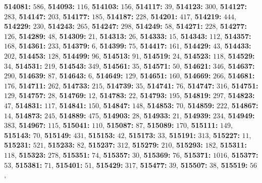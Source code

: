 \textsf{\bfseries 514081:} $586$, \textsf{\bfseries 514093:} $116$, \textsf{\bfseries 514103:} $156$, \textsf{\bfseries 514117:} $39$, \textsf{\bfseries 514123:} $300$, \textsf{\bfseries 514127:} $283$, \textsf{\bfseries 514147:} $203$, \textsf{\bfseries 514177:} $185$, \textsf{\bfseries 514187:} $228$, \textsf{\bfseries 514201:} $417$, \textsf{\bfseries 514219:} $444$, \textsf{\bfseries 514229:} $230$, \textsf{\bfseries 514243:} $265$, \textsf{\bfseries 514247:} $298$, \textsf{\bfseries 514249:} $58$, \textsf{\bfseries 514271:} $228$, \textsf{\bfseries 514277:} $126$, \textsf{\bfseries 514289:} $48$, \textsf{\bfseries 514309:} $21$, \textsf{\bfseries 514313:} $26$, \textsf{\bfseries 514333:} $15$, \textsf{\bfseries 514343:} $112$, \textsf{\bfseries 514357:} $168$, \textsf{\bfseries 514361:} $233$, \textsf{\bfseries 514379:} $6$, \textsf{\bfseries 514399:} $75$, \textsf{\bfseries 514417:} $161$, \textsf{\bfseries 514429:} $43$, \textsf{\bfseries 514433:} $202$, \textsf{\bfseries 514453:} $128$, \textsf{\bfseries 514499:} $96$, \textsf{\bfseries 514513:} $91$, \textsf{\bfseries 514519:} $24$, \textsf{\bfseries 514523:} $118$, \textsf{\bfseries 514529:} $34$, \textsf{\bfseries 514531:} $219$, \textsf{\bfseries 514543:} $349$, \textsf{\bfseries 514561:} $35$, \textsf{\bfseries 514571:} $50$, \textsf{\bfseries 514621:} $346$, \textsf{\bfseries 514637:} $290$, \textsf{\bfseries 514639:} $87$, \textsf{\bfseries 514643:} $6$, \textsf{\bfseries 514649:} $129$, \textsf{\bfseries 514651:} $160$, \textsf{\bfseries 514669:} $266$, \textsf{\bfseries 514681:} $176$, \textsf{\bfseries 514711:} $262$, \textsf{\bfseries 514733:} $215$, \textsf{\bfseries 514739:} $35$, \textsf{\bfseries 514741:} $76$, \textsf{\bfseries 514747:} $316$, \textsf{\bfseries 514751:} $129$, \textsf{\bfseries 514757:} $28$, \textsf{\bfseries 514769:} $12$, \textsf{\bfseries 514783:} $22$, \textsf{\bfseries 514793:} $195$, \textsf{\bfseries 514819:} $297$, \textsf{\bfseries 514823:} $47$, \textsf{\bfseries 514831:} $117$, \textsf{\bfseries 514841:} $150$, \textsf{\bfseries 514847:} $148$, \textsf{\bfseries 514853:} $70$, \textsf{\bfseries 514859:} $222$, \textsf{\bfseries 514867:} $14$, \textsf{\bfseries 514873:} $245$, \textsf{\bfseries 514889:} $475$, \textsf{\bfseries 514903:} $28$, \textsf{\bfseries 514933:} $21$, \textsf{\bfseries 514939:} $234$, \textsf{\bfseries 514949:} $383$, \textsf{\bfseries 514967:} $115$, \textsf{\bfseries 515041:} $110$, \textsf{\bfseries 515087:} $87$, \textsf{\bfseries 515089:} $170$, \textsf{\bfseries 515111:} $149$, \textsf{\bfseries 515143:} $70$, \textsf{\bfseries 515149:} $431$, \textsf{\bfseries 515153:} $42$, \textsf{\bfseries 515173:} $33$, \textsf{\bfseries 515191:} $313$, \textsf{\bfseries 515227:} $11$, \textsf{\bfseries 515231:} $521$, \textsf{\bfseries 515233:} $82$, \textsf{\bfseries 515237:} $312$, \textsf{\bfseries 515279:} $210$, \textsf{\bfseries 515293:} $182$, \textsf{\bfseries 515311:} $118$, \textsf{\bfseries 515323:} $278$, \textsf{\bfseries 515351:} $74$, \textsf{\bfseries 515357:} $30$, \textsf{\bfseries 515369:} $76$, \textsf{\bfseries 515371:} $1016$, \textsf{\bfseries 515377:} $53$, \textsf{\bfseries 515381:} $71$, \textsf{\bfseries 515401:} $51$, \textsf{\bfseries 515429:} $317$, \textsf{\bfseries 515477:} $39$, \textsf{\bfseries 515507:} $38$, \textsf{\bfseries 515519:} $56$, 
